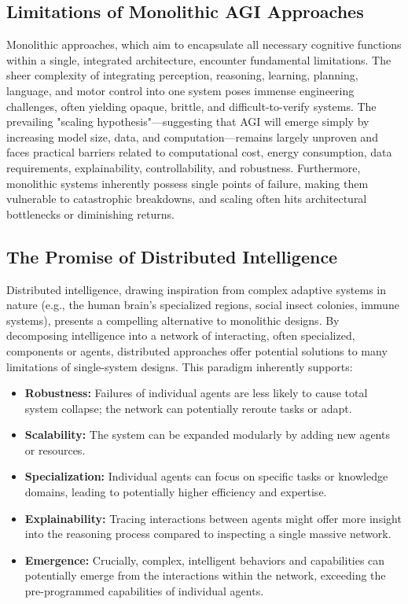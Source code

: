 \documentclass[12pt]{amsart}
\begin{document}
\subsection{Limitations of Monolithic AGI Approaches}
Monolithic approaches, which aim to encapsulate all necessary cognitive functions within a single, integrated architecture, encounter fundamental limitations. The sheer complexity of integrating perception, reasoning, learning, planning, language, and motor control into one system poses immense engineering challenges, often yielding opaque, brittle, and difficult-to-verify systems. The prevailing "scaling hypothesis"—suggesting that AGI will emerge simply by increasing model size, data, and computation—remains largely unproven and faces practical barriers related to computational cost, energy consumption, data requirements, explainability, controllability, and robustness. Furthermore, monolithic systems inherently possess single points of failure, making them vulnerable to catastrophic breakdowns, and scaling often hits architectural bottlenecks or diminishing returns.

\subsection{The Promise of Distributed Intelligence}
Distributed intelligence, drawing inspiration from complex adaptive systems in nature (e.g., the human brain's specialized regions, social insect colonies, immune systems), presents a compelling alternative to monolithic designs. By decomposing intelligence into a network of interacting, often specialized, components or agents, distributed approaches offer potential solutions to many limitations of single-system designs. This paradigm inherently supports:
\begin{itemize}[leftmargin=*]
    \item \textbf{Robustness:} Failures of individual agents are less likely to cause total system collapse; the network can potentially reroute tasks or adapt.
    \item \textbf{Scalability:} The system can be expanded modularly by adding new agents or resources.
    \item \textbf{Specialization:} Individual agents can focus on specific tasks or knowledge domains, leading to potentially higher efficiency and expertise.
    \item \textbf{Explainability:} Tracing interactions between agents might offer more insight into the reasoning process compared to inspecting a single massive network.
    \item \textbf{Emergence:} Crucially, complex, intelligent behaviors and capabilities can potentially emerge from the interactions within the network, exceeding the pre-programmed capabilities of individual agents.
\end{itemize}
\end{document}
